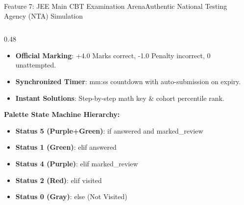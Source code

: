 \documentclass[aspectratio=169,10pt]{beamer}
\begin{document}
\begin{frame}[t]{Feature 7: JEE Main CBT Examination Arena}{Authentic National Testing Agency (NTA) Simulation}
\begin{columns}[t]
\begin{column}{0.48\textwidth}
\begin{itemize}
        \item {\fontsize{8.0}{9.8}\selectfont \textbf{Official Marking}: +4.0 Marks correct, -1.0 Penalty incorrect, 0 unattempted.}
        \item {\fontsize{8.0}{9.8}\selectfont \textbf{Synchronized Timer}: mm:ss countdown with auto-submission on expiry.}
        \item {\fontsize{8.0}{9.8}\selectfont \textbf{Instant Solutions}: Step-by-step math key \& cohort percentile rank.}
      \end{itemize}
      \vspace{0.1cm}
      {\fontsize{8.0}{10.0}\selectfont\textbf{\textcolor{KoinexaRed}{Palette State Machine Hierarchy:}}}
      \begin{itemize}\setlength{\itemsep}{0.8pt}
        \item {\fontsize{7.5}{9.2}\selectfont \textbf{Status 5 (Purple+Green)}: if answered and marked\_review}
        \item {\fontsize{7.5}{9.2}\selectfont \textbf{Status 1 (Green)}: elif answered}
        \item {\fontsize{7.5}{9.2}\selectfont \textbf{Status 4 (Purple)}: elif marked\_review}
        \item {\fontsize{7.5}{9.2}\selectfont \textbf{Status 2 (Red)}: elif visited}
        \item {\fontsize{7.5}{9.2}\selectfont \textbf{Status 0 (Gray)}: else (Not Visited)}
      \end{itemize}
    \end{column}
  \end{columns}
\end{frame}
\end{document}

